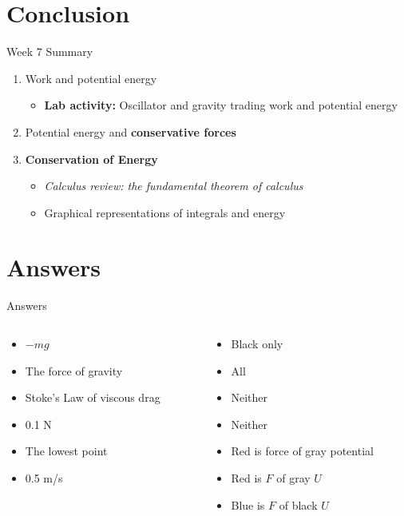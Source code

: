 \documentclass{beamer}
\begin{document}
\section{Conclusion}

\begin{frame}{Week 7 Summary}
\begin{enumerate}
\item \alert{Work} and \alert{potential energy}
\begin{itemize}
\item \textbf{Lab activity:} Oscillator and gravity trading work and potential energy
\end{itemize}
\item Potential energy and \textbf{conservative forces}
\item \alert{\textbf{Conservation of Energy}}
\begin{itemize}
\item \textit{Calculus review: the fundamental theorem of calculus}
\item Graphical representations of integrals and energy
\end{itemize}
\end{enumerate}
\end{frame}

\section{Answers}

\begin{frame}{Answers}
\begin{columns}[T]
\begin{column}{0.5\textwidth}
\begin{itemize}
\item $-mg$
\item The force of gravity
\item Stoke's Law of viscous drag
\item 0.1 N
\item The lowest point
\item 0.5 m/s
\end{itemize}
\end{column}
\begin{column}{0.5\textwidth}
\begin{itemize}
\item Black only
\item All
\item Neither
\item Neither
\item Red is force of gray potential
\item Red is $F$ of gray $U$
\item Blue is $F$ of black $U$
\end{itemize}
\end{column}
\end{columns}
\end{frame}
\end{document}
